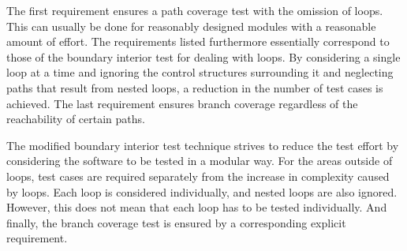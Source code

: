 \documentclass[master,english,smartquotes,apa]{hgbthesis}
\begin{document}
	The first requirement ensures a path coverage test with the omission of loops. This can usually be done for reasonably designed modules with a reasonable amount of effort. The requirements listed furthermore essentially correspond to those of the boundary interior test for dealing with loops. By considering a single loop at a time and ignoring the control structures surrounding it and neglecting paths that result from nested loops, a reduction in the number of test cases is achieved. The last requirement ensures branch coverage regardless of the reachability of certain paths.

	The modified boundary interior test technique strives to reduce the test effort by considering the software to be tested in a modular way. For the areas outside of loops, test cases are required separately from the increase in complexity caused by loops. Each loop is considered individually, and nested loops are also ignored. However, this does not mean that each loop has to be tested individually. And finally, the branch coverage test is ensured by a corresponding explicit requirement.	
\end{document}
